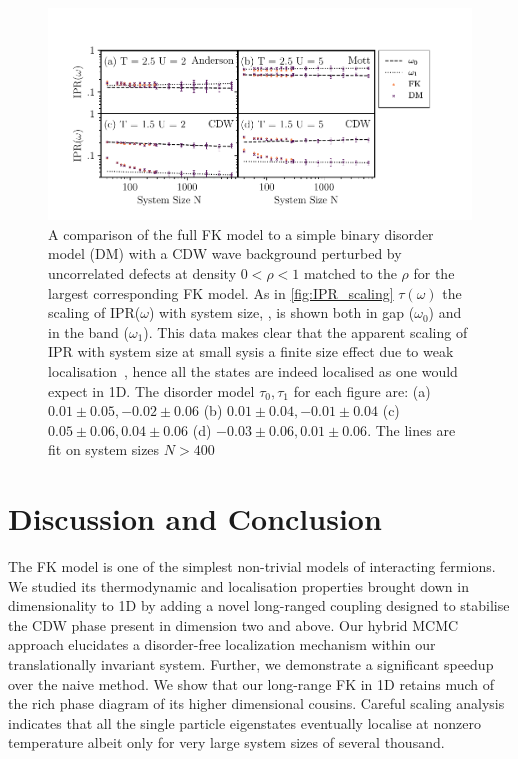 \hypertarget{fig:DM_IPR_scaling}{%
\begin{figure}
\centering
\includegraphics[width=1\textwidth,height=\textheight]{figure_code/fk_chapter/disorder_model/DM_IPR_scaling}
\caption[{A comparison of the full FK model to a simple binary disorder model.}]{A comparison of the full FK model to a simple binary disorder model (DM) with a CDW wave background perturbed by uncorrelated defects at density \(0 < \rho < 1\) matched to the \(\rho\) for the largest corresponding FK model. As in \cref{fig:IPR_scaling} \(\tau(\omega)\) the scaling of IPR(\(\omega\)) with system size, , is shown both in gap (\(\omega_0\)) and in the band (\(\omega_1\)). This data makes clear that the apparent scaling of IPR with system size at small sysis a finite size effect due to weak localisation~\autocite{antipovInteractionTunedAndersonMott2016}, hence all the states are indeed localised as one would expect in 1D. The disorder model \(\tau_0,\tau_1\) for each figure are: (a) \(0.01\pm0.05, -0.02\pm0.06\) (b) \(0.01\pm0.04, -0.01\pm0.04\) (c) \(0.05\pm0.06, 0.04\pm0.06\) (d) \(-0.03\pm0.06, 0.01\pm0.06\). The lines are fit on system sizes \(N > 400\)}
\label{fig:DM_IPR_scaling}
\end{figure}
}

\hypertarget{fk-conclusion}{%
\section{Discussion and Conclusion}\label{fk-conclusion}}

The FK model is one of the simplest non-trivial models of interacting fermions. We studied its thermodynamic and localisation properties brought down in dimensionality to 1D by adding a novel long-ranged coupling designed to stabilise the CDW phase present in dimension two and above. Our hybrid MCMC approach elucidates a disorder-free localization mechanism within our translationally invariant system. Further, we demonstrate a significant speedup over the naive method. We show that our long-range FK in 1D retains much of the rich phase diagram of its higher dimensional cousins. Careful scaling analysis indicates that all the single particle eigenstates eventually localise at nonzero temperature albeit only for very large system sizes of several thousand.

